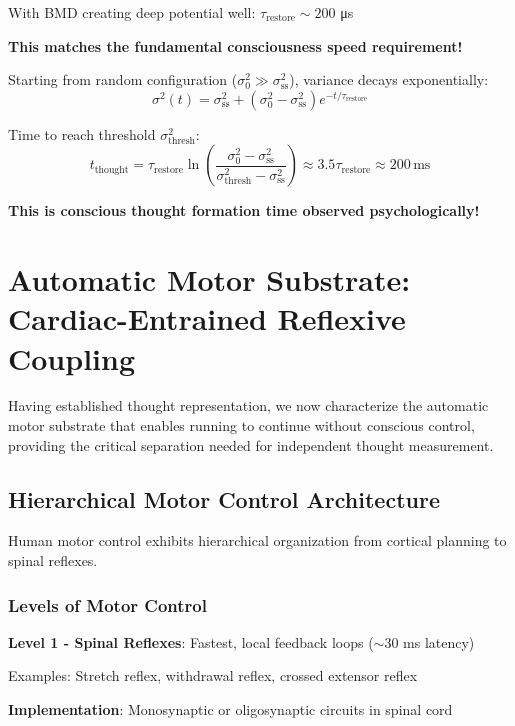 \documentclass[11pt,onecolumn]{article}
\begin{document}
With BMD creating deep potential well: $\tau_{\text{restore}} \sim 200$ μs

\textbf{This matches the fundamental consciousness speed requirement!}

Starting from random configuration ($\sigma_0^2 \gg \sigma_{\text{ss}}^2$), variance decays exponentially:
\begin{equation}
\sigma^2(t) = \sigma_{\text{ss}}^2 + (\sigma_0^2 - \sigma_{\text{ss}}^2)e^{-t/\tau_{\text{restore}}}
\end{equation}

Time to reach threshold $\sigma_{\text{thresh}}^2$:
\begin{equation}
t_{\text{thought}} = \tau_{\text{restore}} \ln\left(\frac{\sigma_0^2 - \sigma_{\text{ss}}^2}{\sigma_{\text{thresh}}^2 - \sigma_{\text{ss}}^2}\right) \approx 3.5\tau_{\text{restore}} \approx 200\,\text{ms}
\end{equation}

\textbf{This is conscious thought formation time observed psychologically!}

\clearpage

\section{Automatic Motor Substrate: Cardiac-Entrained Reflexive Coupling}

Having established thought representation, we now characterize the automatic motor substrate that enables running to continue without conscious control, providing the critical separation needed for independent thought measurement.

\subsection{Hierarchical Motor Control Architecture}

Human motor control exhibits hierarchical organization from cortical planning to spinal reflexes.

\subsubsection{Levels of Motor Control}

\textbf{Level 1 - Spinal Reflexes}: Fastest, local feedback loops ($\sim 30$ ms latency)

Examples: Stretch reflex, withdrawal reflex, crossed extensor reflex

\textbf{Implementation}: Monosynaptic or oligosynaptic circuits in spinal cord
\end{document}
